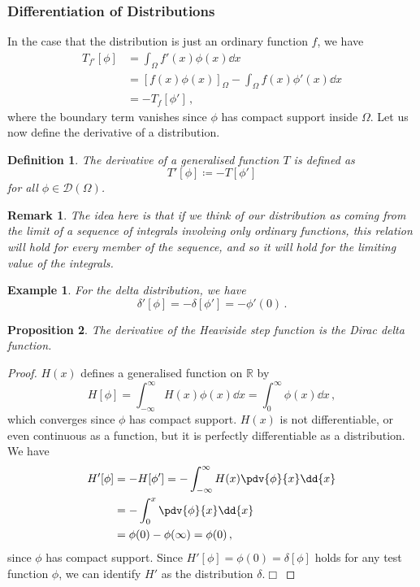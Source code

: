 \documentclass{article}
\theoremstyle{plain}\theoremheaderfont{\normalfont\itshape}\theorembodyfont{\rmfamily}\theoremseparator{.}\newtheorem*{rem}{Remark}\newtheorem*{ex}{Example}\newtheorem*{proof}{Proof}\newtheorem*{altp}{Alternative proof}
\theoremstyle{plain}\theoremheaderfont{\normalfont\bfseries}\theorembodyfont{\rmfamily}\theoremseparator{.}\newtheorem{thm}{Theorem}[section]\newtheorem{lem}[thm]{Lemma}\newtheorem{prop}[thm]{Proposition}\newtheorem*{cor}{Corollary}\newtheorem{defn}[thm]{Definition}\newtheorem{clm}[thm]{Claim}\newtheorem{clminproof}{Claim}
\theoremstyle{break}\theoremheaderfont{\normalfont\itshape}\theorembodyfont{\rmfamily}\theoremseparator{.\medskip}\newtheorem*{proofskip}{Proof}\newtheorem*{exs}{Examples}\newtheorem*{rems}{Remarks}
\theoremstyle{break}\theoremheaderfont{\normalfont\bfseries}\theorembodyfont{\rmfamily}\theoremseparator{.\medskip}\newtheorem{lemskip}[thm]{Lemma}\newtheorem{defnskip}[thm]{Definition}\newtheorem{propskip}[thm]{Proposition}\newtheorem{thmskip}[thm]{Theorem}
\numberwithin{equation}{section}
\newcommand{\qed}{\hfill\ensuremath{\Box}}
\begin{document}
	\subsubsection{Differentiation of Distributions}
	In the case that the distribution is just an ordinary function \(f\), we have
	\begin{align*}
		T_{f'}[\phi]&=\int_\Omega f'(x)\phi(x)\dd{x}\\
		&=[f(x)\phi(x)]_\Omega-\int_\Omega f(x)\phi'(x)\dd{x}\\
		&=-T_f[\phi']\,,
	\end{align*}
	where the boundary term vanishes since \(\phi\) has compact support inside \(\Omega\). Let us now define the derivative of a distribution.
	\begin{defn}
		The derivative of a generalised function \(T\) is defined as
		\[T'[\phi]\coloneqq -T[\phi']\]
		for all \(\phi\in\mathcal{D}(\Omega)\).
	\end{defn}
	\begin{rem}
		The idea here is that if we think of our distribution as coming from the limit of a sequence of integrals involving only ordinary functions, this relation will hold for every member of the sequence, and so it will hold for the limiting value of the integrals.
	\end{rem}
	\begin{ex}
		For the delta distribution, we have
		\[\delta'[\phi]=-\delta[\phi']=-\phi'(0)\,.\]
	\end{ex}
	\begin{prop}
		The derivative of the Heaviside step function is the Dirac delta function.
	\end{prop}
	\begin{proof}
		\(H(x)\) defines a generalised function on \(\mathbb{R}\) by
		\[H[\phi]=\int_{-\infty}^{\infty}H(x)\phi(x)\dd{x}=\int_{0}^{\infty}\phi(x)\dd{x}\,,\]
		which converges since \(\phi\) has compact support. \(H(x)\) is not differentiable, or even continuous as a function, but it is perfectly differentiable as a distribution. We have
		\begin{align*}
			H'[\phi]&=-H[\phi']=-\int_{-\infty}^{\infty}H(x)\pdv{\phi}{x}\dd{x}\\
			&=-\int_{0}^{x}\pdv{\phi}{x}\dd{x}\\
			&=\phi(0)-\phi(\infty)=\phi(0)\,,
		\end{align*}
		since \(\phi\) has compact support. Since \(H'[\phi]=\phi(0)=\delta[\phi]\) holds for any test function \(\phi\), we can identify \(H'\) as the distribution \(\delta\).\qed
	\end{proof}
	
\end{document}
